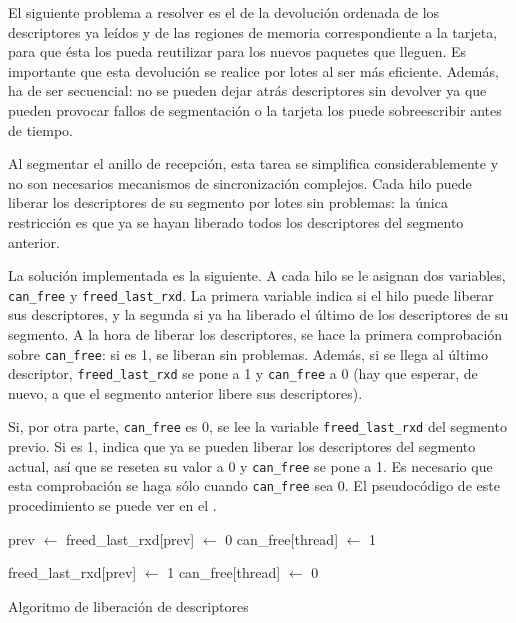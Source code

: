 \documentclass[twoside, 12pt, draft]{epstfg}
\begin{document}
El siguiente problema a resolver es el de la devolución ordenada de los descriptores ya leídos y de las regiones de memoria correspondiente a la tarjeta, para que ésta los pueda reutilizar para los nuevos paquetes que lleguen. Es importante que esta devolución se realice por lotes al ser más eficiente. Además, ha de ser secuencial: no se pueden dejar atrás descriptores sin devolver ya que pueden provocar fallos de segmentación o la tarjeta los puede sobreescribir antes de tiempo.

Al segmentar el anillo de recepción, esta tarea se simplifica considerablemente y no son necesarios mecanismos de sincronización complejos. Cada hilo puede liberar los descriptores de su segmento por lotes sin problemas: la única restricción es que ya se hayan liberado todos los descriptores del segmento anterior.

La solución implementada es la siguiente. A cada hilo se le asignan dos variables, \texttt{can\_free} y \texttt{freed\_last\_rxd}. La primera variable indica si el hilo puede liberar sus descriptores, y la segunda si ya ha liberado el último de los descriptores de su segmento. A la hora de liberar los descriptores, se hace la primera comprobación sobre \texttt{can\_free}: si es 1, se liberan sin problemas. Además, si se llega al último descriptor, \texttt{freed\_last\_rxd} se pone a 1 y \texttt{can\_free} a 0 (hay que esperar, de nuevo, a que el segmento anterior libere sus descriptores).

Si, por otra parte, \texttt{can\_free} es 0, se lee la variable \texttt{freed\_last\_rxd} del segmento previo. Si es 1, indica que ya se pueden liberar los descriptores del segmento actual, así que se resetea su valor a 0 y \texttt{can\_free} se pone a 1. Es necesario que esta comprobación se haga sólo cuando \texttt{can\_free} sea 0. El pseudocódigo de este procedimiento se puede ver en el .

\begin{algorithm}[btp]
\begin{algorithmic}
\State prev $\gets$ 
		\State freed\_last\_rxd[prev] $\gets$ 0
		\State can\_free[thread] $\gets$ 1
		\State {}
	\EndIf

		\State {}

			\State {}
			\State freed\_last\_rxd[prev] $\gets$ 1
			\State can\_free[thread] $\gets$ 0
		\EndIf
	\EndIf
\EndFunction
\end{algorithmic}
\caption{Algoritmo de liberación de descriptores}
\label{lst:AlgoritmoDescriptores}
\end{algorithm}
\end{document}
